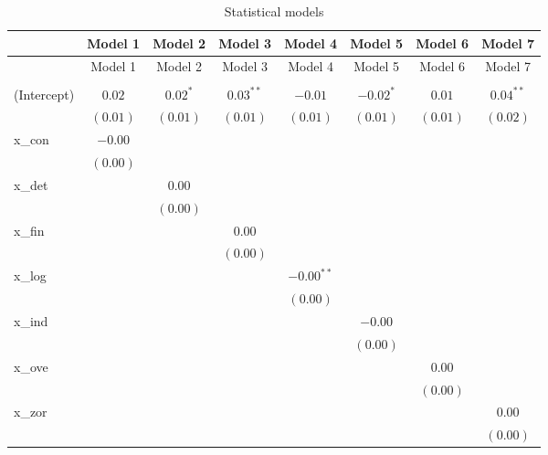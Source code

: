 
\begin{center}
\begin{longtable}{l c c c c c c c }
\hline
 & Model 1 & Model 2 & Model 3 & Model 4 & Model 5 & Model 6 & Model 7 \\
\hline
\endfirsthead
\hline
 & Model 1 & Model 2 & Model 3 & Model 4 & Model 5 & Model 6 & Model 7 \\
\hline
\endhead
\hline
\endfoot
\hline
\multicolumn{8}{l}{\scriptsize{$^{***}p<0.001$, $^{**}p<0.01$, $^*p<0.05$}}\\
\caption{Statistical models}
\label{table:coefficients}
\endlastfoot
(Intercept) & $0.02$   & $0.02^{*}$ & $0.03^{**}$ & $-0.01$      & $-0.02^{*}$ & $0.01$   & $0.04^{**}$ \\
            & $(0.01)$ & $(0.01)$   & $(0.01)$    & $(0.01)$     & $(0.01)$    & $(0.01)$ & $(0.02)$    \\
x\_con      & $-0.00$  &            &             &              &             &          &             \\
            & $(0.00)$ &            &             &              &             &          &             \\
x\_det      &          & $0.00$     &             &              &             &          &             \\
            &          & $(0.00)$   &             &              &             &          &             \\
x\_fin      &          &            & $0.00$      &              &             &          &             \\
            &          &            & $(0.00)$    &              &             &          &             \\
x\_log      &          &            &             & $-0.00^{**}$ &             &          &             \\
            &          &            &             & $(0.00)$     &             &          &             \\
x\_ind      &          &            &             &              & $-0.00$     &          &             \\
            &          &            &             &              & $(0.00)$    &          &             \\
x\_ove      &          &            &             &              &             & $0.00$   &             \\
            &          &            &             &              &             & $(0.00)$ &             \\
x\_zor      &          &            &             &              &             &          & $0.00$      \\
            &          &            &             &              &             &          & $(0.00)$    \\
\end{longtable}
\end{center}
